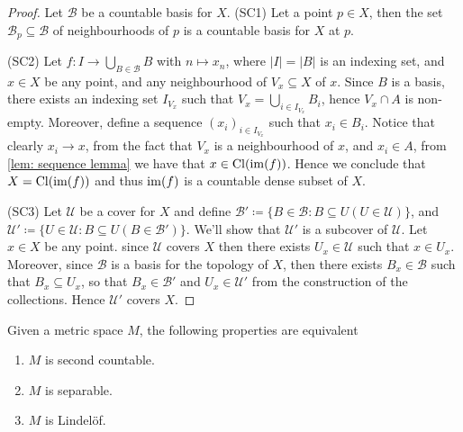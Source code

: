 \begin{proof}
    Let \(\mathcal B\) be a countable basis for \(X\).
    (SC1) Let a point \(p \in X\), then the set \(\mathcal B_p \subseteq \mathcal
    B\) of neighbourhoods of \(p\) is a countable basis for \(X\) at \(p\).

    (SC2) Let \(f: I \to \bigcup_{B \in \mathcal B} B\) with \(n \mapsto x_n\),
    where \(|I| = |B|\) is an indexing set, and \(x \in X\) be any point, and any
    neighbourhood of \(V_x \subseteq X\) of \(x\). Since \(B\) is a basis, there
    exists an indexing set \(I_{V_x}\) such that \(V_x = \bigcup_{i \in  I_{V_x}}
    B_i\), hence \(V_x \cap A\) is non-empty. Moreover, define a sequence
    \((x_i)_{i \in I_{V_x}}\) such that \(x_i \in B_i\). Notice that clearly \(x_i
    \to x\), from the fact that \(V_x\) is a neighbourhood of \(x\), and \(x_i \in
    A\), from \cref{lem: sequence lemma} we have that \(x \in \operatorname{Cl}(\operatorname{im}(f))\).
    Hence we conclude that \(X = \operatorname{Cl}(\operatorname{im}(f))\) and thus \(\operatorname{im}(f)\) is a
    countable dense subset of \(X\).

    (SC3) Let \(\mathcal U\) be a cover for \(X\) and define \(\mathcal B' \coloneq
    \{B \in \mathcal B \colon B \subseteq U (U \in \mathcal U)\}\), and \(\mathcal
    U' \coloneq \{U \in \mathcal U \colon B \subseteq U (B \in \mathcal
    B')\}\). We'll show that \(\mathcal U'\) is a subcover of \(\mathcal U\). Let
    \(x \in X\) be any point.  since \(\mathcal U\) covers \(X\) then there exists
    \(U_x \in \mathcal U\) such that \(x \in U_x\). Moreover, since \(\mathcal B\)
    is a basis for the topology of \(X\), then there exists \(B_x \in \mathcal B\)
    such that \(B_x \subseteq U_x\), so that \(B_x \in \mathcal B'\) and \(U_x \in
    \mathcal U'\) from the construction of the collections. Hence \(\mathcal U'\)
    covers \(X\).
\end{proof}

\begin{proposition}\label{prop: metric space properties}
    Given a metric space \(M\), the following properties are equivalent
    \begin{enumerate}[(MS1)]
        \item \(M\) is second countable.
        \item \(M\) is separable.
        \item \(M\) is Lindelöf.
    \end{enumerate}
\end{proposition}

